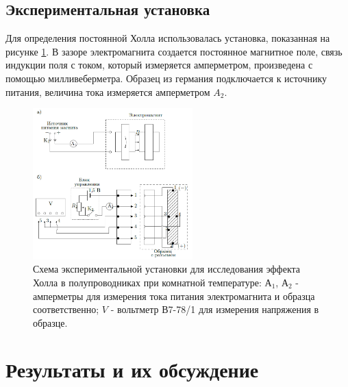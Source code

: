 \documentclass[a4paper,12pt]{article} %
\begin{document}
\subsection*{Экспериментальная установка}
Для определения постоянной Холла использовалась установка, показанная на рисунке \ref{установка}. В зазоре электромагнита создается постоянное магнитное поле, связь индукции поля с током, который измеряется амперметром, произведена с помощью милливеберметра. Образец из германия подключается к источнику питания, величина тока измеряется амперметром $A_2$.
\begin{figure}[h!]
\begin{center}
\includegraphics[width=0.55\textwidth]{Установка}
\caption{Схема экспериментальной установки для исследования эффекта Холла в полупроводниках при комнатной температуре: А$_1$, А$_2$ - амперметры для измерения тока питания электромагнита и образца соответственно; $V$ - вольтметр В7-78/1 для измерения напряжения в образце.} \label{установка}
\end{center}
\end{figure} 
\section{Результаты и их обсуждение}
\end{document}
